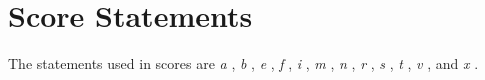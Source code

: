 \begin{comment}
\documentclass[10pt]{article}
\usepackage{fullpage, graphicx, url}
\setlength{\parskip}{1ex}
\setlength{\parindent}{0ex}
\title{Score Statements}



\begin{tabular}{ccc}
The Alternative Csound Reference Manual & & \\
Previous &The Standard Numeric Score &Next

\end{tabular}

\end{comment}
\section{Score Statements}


  The statements used in scores are \emph{a}
, \emph{b}
, \emph{e}
, \emph{f}
, \emph{i}
, \emph{m}
, \emph{n}
, \emph{r}
, \emph{s}
, \emph{t}
, \emph{v}
, and \emph{x}
. 


\begin{comment}
\begin{tabular}{lcr}
Previous &Home &Next \\
Evaluation of Expressions &Up &Sine/Cosine Generators

\end{tabular}



\end{comment}
